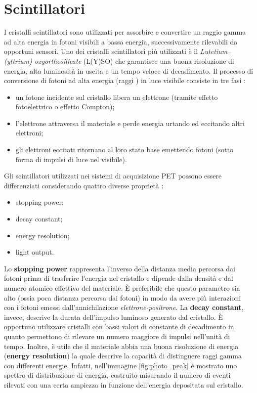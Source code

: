 \section{Scintillatori}
I cristalli scintillatori sono utilizzati per assorbire e convertire un raggio gamma ad alta energia in fotoni visibili a bassa energia, successivamente rilevabili da opportuni sensori. Uno dei cristalli scintillatori più utilizzati è il \textit{Lutetium–(yttrium) oxyorthosilicate} (L(Y)SO) che garantisce una buona risoluzione di energia, alta luminosità in uscita e un tempo veloce di decadimento. Il processo di conversione di fotoni ad alta energia (raggi \textgamma) in luce visibile consiste in tre fasi \cite{RamseyDerek}:
\begin{itemize}
	\item un fotone incidente sul cristallo libera un elettrone (tramite effetto fotoelettrico o effetto Compton);
	\item l'elettrone attraversa il materiale e perde energia urtando ed eccitando altri elettroni;
	\item gli elettroni eccitati ritornano al loro stato base emettendo fotoni (sotto forma di impulsi di luce nel visibile).
\end{itemize}
Gli scintillatori utilizzati nei sistemi di acquisizione PET possono essere differenziati considerando quattro diverse proprietà \cite{Schmitz2013ThePO}:
\begin{itemize}
	\item stopping power;
	\item decay constant;
	\item energy resolution;
	\item light output.
\end{itemize}
Lo \textbf{stopping power} rappresenta l'inverso della distanza media percorsa dai fotoni prima di trasferire l'energia nel cristallo e dipende dalla densità e dal numero atomico effettivo del materiale. \`E preferibile che questo parametro sia alto (ossia poca distanza percorsa dai fotoni) in modo da avere più interazioni con i fotoni emessi dall'annichilazione \textit{elettrone-positrone}. La \textbf{decay constant}, invece, descrive la durata dell'impulso luminoso generato dal cristallo. \`E opportuno utilizzare cristalli con bassi valori di constante di decadimento in quanto permettono di rilevare un numero maggiore di impulsi nell'unità di tempo. Inoltre, è utile che il materiale abbia una buona risoluzione di energia (\textbf{energy resolution}) la quale descrive la capacità di distinguere raggi gamma con differenti energie. Infatti, nell'immagine \ref{fig:photo_peak} è mostrato uno spettro di distribuzione di energia, costruito misurando il numero di eventi rilevati con una certa ampiezza in funzione dell'energia depositata sul cristallo.
